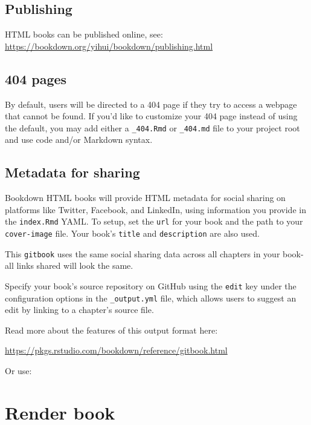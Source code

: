 \documentclass[
]{book}
\theoremstyle{definition}
\theoremstyle{definition}
\theoremstyle{definition}
\theoremstyle{definition}
\theoremstyle{remark}
\begin{document}
\hypertarget{publishing}{%
\subsection{Publishing}\label{publishing}}

HTML books can be published online, see: \url{https://bookdown.org/yihui/bookdown/publishing.html}

\hypertarget{pages}{%
\subsection{404 pages}\label{pages}}

By default, users will be directed to a 404 page if they try to access a webpage that cannot be found. If you'd like to customize your 404 page instead of using the default, you may add either a \texttt{\_404.Rmd} or \texttt{\_404.md} file to your project root and use code and/or Markdown syntax.

\hypertarget{metadata-for-sharing}{%
\subsection{Metadata for sharing}\label{metadata-for-sharing}}

Bookdown HTML books will provide HTML metadata for social sharing on platforms like Twitter, Facebook, and LinkedIn, using information you provide in the \texttt{index.Rmd} YAML. To setup, set the \texttt{url} for your book and the path to your \texttt{cover-image} file. Your book's \texttt{title} and \texttt{description} are also used.

This \texttt{gitbook} uses the same social sharing data across all chapters in your book- all links shared will look the same.

Specify your book's source repository on GitHub using the \texttt{edit} key under the configuration options in the \texttt{\_output.yml} file, which allows users to suggest an edit by linking to a chapter's source file.

Read more about the features of this output format here:

\url{https://pkgs.rstudio.com/bookdown/reference/gitbook.html}

Or use:

\hypertarget{render-book}{%
\section{Render book}\label{render-book}}
\end{document}
